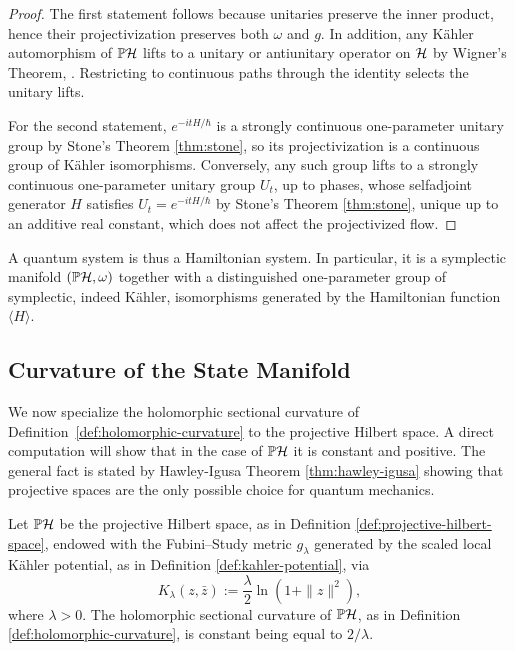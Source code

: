 \begin{proof}
	The first statement follows because unitaries preserve the inner product, hence their projectivization preserves both $\omega$ and $g$. In addition, any Kähler automorphism of $\PH$ lifts to a unitary or antiunitary operator on $\H$ by Wigner's Theorem, \cite[Theorem 12.11]{morettiSpectralTheoryQuantum}. Restricting to continuous paths through the identity selects the unitary lifts. 
	
	For the second statement, $e^{-itH/\hbar}$ is a strongly
	continuous one-parameter unitary group by Stone's Theorem \ref{thm:stone}, so its projectivization is a continuous group of Kähler isomorphisms. Conversely, any such group lifts to a strongly continuous one-parameter unitary group $U_t$, up to phases, whose selfadjoint generator $H$ satisfies $U_t=e^{-itH/\hbar}$ by Stone's Theorem \ref{thm:stone}, unique up to an additive real constant, which does not affect the projectivized flow.
\end{proof}

\begin{remark}
	A quantum system is thus a Hamiltonian system. In particular, it is a symplectic manifold $(\PH,\omega)$ together with a distinguished one-parameter group of symplectic, indeed Kähler, isomorphisms generated by the Hamiltonian function $\langle H\rangle$.
\end{remark}

\subsection*{Curvature of the State Manifold}

We now specialize the holomorphic sectional curvature of
Definition~\ref{def:holomorphic-curvature} to the projective Hilbert
space. A direct computation will show that in the case of $\PH$ it is constant and positive. The general fact is stated by Hawley-Igusa Theorem \ref{thm:hawley-igusa} showing that projective spaces are the only possible choice for quantum mechanics.

\begin{proposition}
	\label{prop:ph-curvature-lambda}
	Let $\PH$ be the projective Hilbert space, as in Definition \ref{def:projective-hilbert-space}, endowed with the Fubini--Study metric $g_\lambda$ generated by the scaled local Kähler potential, as in Definition \ref{def:kahler-potential}, via $$K_\lambda(z, \bar{z}) := \frac{\lambda}{2} \ln(1 + \|z\|^2),$$ where $\lambda > 0$. The holomorphic sectional curvature of $\PH$, as in Definition \ref{def:holomorphic-curvature}, is constant being equal to $2/\lambda$.
\end{proposition}


